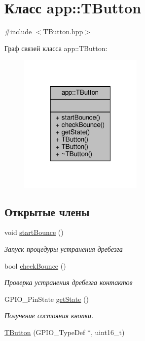 \hypertarget{classapp_1_1_t_button}{}\section{Класс app\+:\+:T\+Button}
\label{classapp_1_1_t_button}


{\ttfamily \#include $<$T\+Button.\+hpp$>$}



Граф связей класса app\+:\+:T\+Button\+:\nopagebreak
\begin{figure}[H]
\begin{center}
\leavevmode
\includegraphics[width=171pt]{classapp_1_1_t_button__coll__graph}
\end{center}
\end{figure}
\subsection*{Открытые члены}
\begin{DoxyCompactItemize}
\item 
void \hyperlink{classapp_1_1_t_button_a92fc2dcb3d54a563b7b1a96900a4717c}{start\+Bounce} ()
\begin{DoxyCompactList}\small\item\em Запуск процедуры устранения дребезга \end{DoxyCompactList}\item 
bool \hyperlink{classapp_1_1_t_button_a52714fba93672ac5690de6f9d56e9a5f}{check\+Bounce} ()
\begin{DoxyCompactList}\small\item\em Проверка устранения дребезга контактов \end{DoxyCompactList}\item 
G\+P\+I\+O\+\_\+\+Pin\+State \hyperlink{classapp_1_1_t_button_a1d6cf41ee0a98746592b1d604041f8ce}{get\+State} ()
\begin{DoxyCompactList}\small\item\em Получение состояния кнопки. \end{DoxyCompactList}\item 
\hyperlink{classapp_1_1_t_button_a846432bef1a2f5f2705eef5f95d22ae2}{T\+Button} (G\+P\+I\+O\+\_\+\+Type\+Def $\ast$, uint16\+\_\+t)
\end{DoxyCompactItemize}


